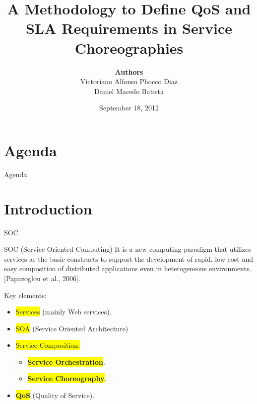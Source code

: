 \documentclass[xcolor=svgnames]{beamer}
\title[IEEE CAMAD 2012]
    {A Methodology to Define QoS and SLA Requirements in Service Choreographies}
\author[Alfonso Phocco-Diaz]
	{
		{\bf Authors} \\
		Victoriano Alfonso Phocco Diaz \\%
		Daniel Macedo Batista
	}
\institute[IME-USP]
	{%
	 Departament of Computer Science \\	
	 University of Sao Paulo  \\  [1ex]
	 \texttt{alfonso7@ime.usp.br, batista@ime.usp.br}
	}
\date[September 2012]{September 18, 2012}
\begin{document}


\begin{frame}[plain]
  \titlepage
\end{frame}


\section*{Agenda}
    \begin{frame}{Agenda}
        \tableofcontents
    \end{frame}


\section{Introduction}

    \begin{frame}{SOC}
       	\begin{block}{SOC (Service Oriented Computing)}\vspace{-.3\baselineskip}
          It  is a new computing paradigm that utilizes services as the basic constructs to support the development
	  of rapid, low-cost and easy composition of distributed applications even in
	  heterogeneous environments.  [Papazoglou et al., 2006]. %
        \end{block}
        Key elements:

        \begin{itemize}
           \item <2-> \colorbox{yellow}{Services} (mainly Web services).
           \item <3-> \colorbox{yellow}{SOA} (Service Oriented Architecture)
           \item <4-> \colorbox{yellow}{Service Composition:}
	    \begin{itemize}
                  \item <5-> \colorbox{yellow}{\textbf{Service Orchestration}}.
                  \item <6-> \colorbox{yellow}{\textbf{Service Choreography}}.
                \end{itemize}
           \item <7-> \colorbox{yellow}{\textbf{QoS}} (Quality of Service).
        \end{itemize}

    \end{frame}
\end{document}
